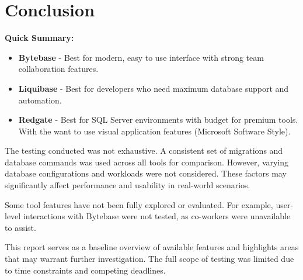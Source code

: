 \documentclass[11pt,a4paper]{article}
\begin{document}
\newpage
\section{Conclusion}

\textbf{Quick Summary:}

\begin{itemize}
    \item \textbf{Bytebase} - Best for modern, easy to use interface with strong team collaboration features.
    \item \textbf{Liquibase} - Best for developers who need maximum database support and automation.
    \item \textbf{Redgate} - Best for SQL Server environments with budget for premium tools. With the want to use visual application features (Microsoft Software Style).
\end{itemize}

The testing conducted was not exhaustive.
A consistent set of migrations and database commands was used across all tools for comparison.
However, varying database configurations and workloads were not considered.
These factors may significantly affect performance and usability in real-world scenarios.

Some tool features have not been fully explored or evaluated.
For example, user-level interactions with Bytebase were not tested, as co-workers were unavailable to assist.

This report serves as a baseline overview of available features and highlights areas that may warrant further investigation.
The full scope of testing was limited due to time constraints and competing deadlines.
\end{document}
